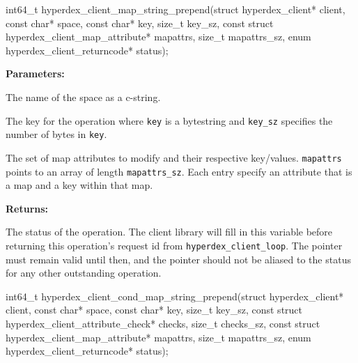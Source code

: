 \funcsep
{}
\begin{ccode}
int64_t hyperdex_client_map_string_prepend(struct hyperdex_client* client,
                const char* space,
                const char* key, size_t key_sz,
                const struct hyperdex_client_map_attribute* mapattrs, size_t mapattrs_sz,
                enum hyperdex_client_returncode* status);
\end{ccode}
\funcdesc 

\noindent\textbf{Parameters:}
\begin{description}[labelindent=\widthof{{\texttt{mapattrs}, \texttt{mapattrs\_sz}}},leftmargin=*,noitemsep,nolistsep,align=right]
\item[\texttt{space}] The name of the space as a c-string.
\item[\texttt{key}, \texttt{key\_sz}] The key for the operation where \texttt{key} is a bytestring and \texttt{key\_sz} specifies the number of bytes in \texttt{key}.
\item[\texttt{mapattrs}, \texttt{mapattrs\_sz}] The set of map attributes to modify and their respective key/values.  \texttt{mapattrs} points to an array of length \texttt{mapattrs\_sz}.  Each entry specify an attribute that is a map and a key within that map.
\end{description}

\noindent\textbf{Returns:}
\begin{description}[labelindent=\widthof{{\texttt{status}}},leftmargin=*,noitemsep,nolistsep,align=right]
\item[\texttt{status}] The status of the operation.  The client library will fill in this variable before returning this operation's request id from \texttt{hyperdex\_client\_loop}.  The pointer must remain valid until then, and the pointer should not be aliased to the status for any other outstanding operation.
\end{description}

\funcsep
{}
\begin{ccode}
int64_t hyperdex_client_cond_map_string_prepend(struct hyperdex_client* client,
                const char* space,
                const char* key, size_t key_sz,
                const struct hyperdex_client_attribute_check* checks, size_t checks_sz,
                const struct hyperdex_client_map_attribute* mapattrs, size_t mapattrs_sz,
                enum hyperdex_client_returncode* status);
\end{ccode}
\funcdesc 

